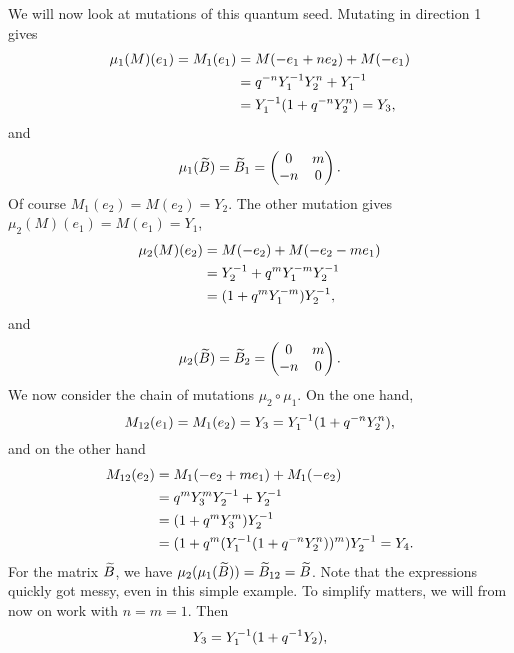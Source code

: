 We will now look at mutations of this quantum seed. Mutating in direction 1 gives
\begin{align*}
	\mu_1(M)(e_1) = M_1(e_1)
	 & = M(-e_1 + n e_2) + M(-e_1)        \\
	 & = q^{-n}Y_1^{-1}Y_2^n + Y_1^{-1}    \\
	 & = Y_1^{-1} (1 + q^{-n}Y_2^n) = Y_3,
\end{align*}
and
\begin{equation*}
	\mu_1(\widetilde{B}) = \widetilde{B}_1 = \begin{pmatrix}
		0  & m \\
		-n & 0
	\end{pmatrix}.
\end{equation*}
%
Of course $M_1(e_2) = M(e_2) = Y_2$. The other mutation gives $\mu_2(M)(e_1) = M(e_1) =
	Y_1$,
\begin{align*}
	\mu_2(M)(e_2) & = M(-e_2) + M(-e_2 - m e_1)     \\
	              & = Y_2^{-1} + q^m Y_1^{-m}Y_2^{-1} \\
	              & = (1 + q^mY_1^{-m})Y_2^{-1},
\end{align*}
and
\begin{equation*}
	\mu_2(\widetilde{B}) = \widetilde{B}_2 = \begin{pmatrix}
		0  & m \\
		-n & 0
	\end{pmatrix}.
\end{equation*}
%
We now consider the chain of mutations $\mu_2 \circ \mu_1$. On the one hand,
\begin{equation*}
	M_{12}(e_1) = M_1(e_2) = Y_3 = Y_1 ^{-1} (1 + q^{-n}Y_2^n),
\end{equation*}
and on the other hand
\begin{align*}
	M_{12}(e_2)
	 & = M_1(-e_2 + m e_1) + M_1(-e_2)                          \\
	 & = q^{m}Y_3^m Y_2^{-1} + Y_2^{-1}                           \\
	 & = (1 + q^m Y_3^m) Y_2^{-1}                                \\
	 & = (1 + q^m (Y_1 ^{-1} (1 + q^{-n}Y_2^n))^m)Y_2^{-1} = Y_4.
\end{align*}
%
For the matrix $\widetilde{B}$, we have $\mu_2 (\mu_1(\widetilde{B})) = \widetilde{B}_{12} = \widetilde{B}$. Note that the
expressions quickly got messy, even in this simple example. To simplify matters, we
will from now on work with $n = m = 1$. Then
\begin{equation*}
	Y_3 = Y_1^{-1} (1 + q^{-1} Y_2),
\end{equation*}
